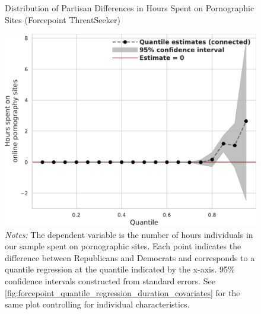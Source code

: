 \documentclass[12pt,twoside]{article}
\begin{document}
\begin{figure}[t]
	\centering
	\caption{Distribution of Partisan Differences in Hours Spent on Pornographic Sites (Forcepoint ThreatSeeker)}
	\includegraphics[width=.7\linewidth]{figs/forcepoint_quantile_reg_duration_adult.pdf}
	\caption*{\footnotesize \emph{Notes:} 
		The dependent variable is the number of hours individuals in our sample spent on pornographic sites.
		Each point indicates the difference between Republicans and Democrats and corresponds to a quantile regression at the quantile indicated by the x-axis.
		95\% confidence intervals constructed from standard errors.
		See \cref{fig:forcepoint_quantile_regression_duration_covariates} for the same plot controlling for individual characteristics.
	}
	\label{fig:forcepoint_quantile_regression_duration}
\end{figure}
\end{document}
